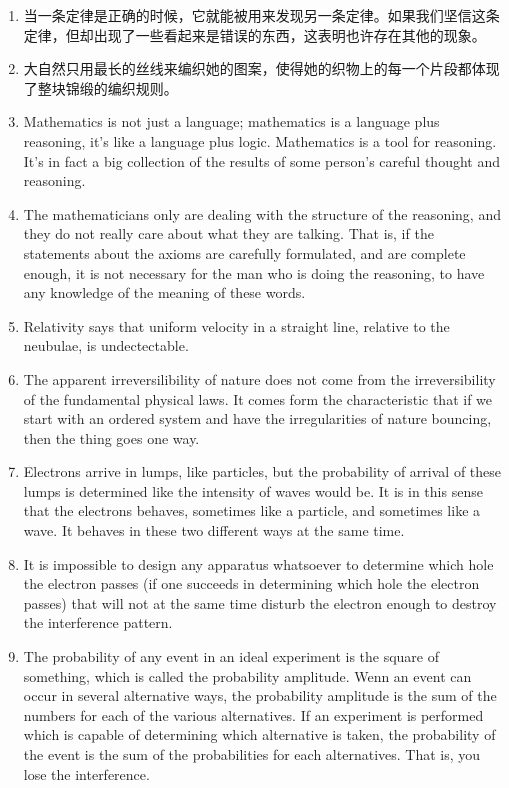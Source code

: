 \documentclass[UTF8]{ctexart}
\begin{document}
		\begin{enumerate}
			
			\item 当一条定律是正确的时候，它就能被用来发现另一条定律。如果我们坚信这条定律，但却出现了一些看起来是错误的东西，这表明也许存在其他的现象。
			
			\item 大自然只用最长的丝线来编织她的图案，使得她的织物上的每一个片段都体现了整块锦缎的编织规则。
			
			\item Mathematics is not just a language; mathematics is a language plus reasoning, it's like a language plus logic. Mathematics is a tool for reasoning. It's in fact a big collection of the results of some person's careful thought and reasoning. 
			
			\item The mathematicians only are dealing with the structure of the reasoning, and they do not really care about what they are talking. That is, if the statements about the axioms are carefully formulated, and are complete enough, it is not necessary for the man who is doing the reasoning, to have any knowledge of the meaning of these words.
			
			\item Relativity says that uniform velocity in a straight line, relative to the neubulae, is undectectable.
			
			\item The apparent irreversilibility of nature does not come from the irreversibility of the fundamental physical laws. It comes form the characteristic that if we start with an ordered system and have the irregularities of nature bouncing, then the thing goes one way.
			
			\item Electrons arrive in lumps, like particles, but the probability of arrival of these lumps is determined like the intensity of  waves would be. It is in this sense that the electrons behaves, sometimes like a particle, and sometimes like a wave. It behaves in these two different ways at the same time. 
			
			\item It is impossible to design any apparatus whatsoever to determine which hole the electron passes (if one succeeds in determining which hole the electron passes) that will not at the same time disturb the electron enough to destroy the interference pattern.
			
			\item The probability of any event in an ideal experiment is the square of something, which is called the probability amplitude. Wenn an event can occur in several alternative ways, the probability amplitude is the sum of the numbers for each of the various alternatives. If an experiment is performed which is capable of determining which alternative is taken,  the probability of the event is the sum of the probabilities for each alternatives. That is, you lose the interference.
			

\end{enumerate}
\end{document}

